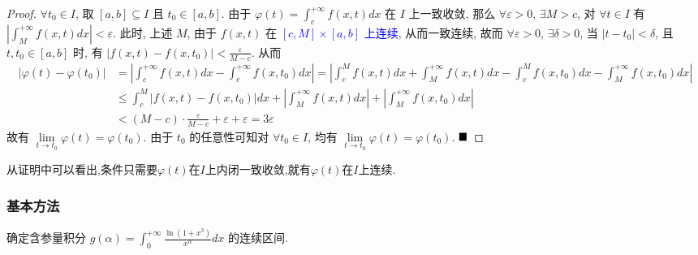 \documentclass[lang=cn,newtx,10pt,scheme=chinese]{elegantbook}
\begin{document}
\begin{proof}
$\forall t_0 \in I$, 取 $[a,b] \subseteq I$ 且 $t_0 \in [a,b]$. 由于 $\varphi(t) = \int_{c}^{+\infty} f(x,t) dx$ 在 $I$ 上一致收敛, 那么 $\forall \varepsilon > 0$, $\exists M > c$, 对 $\forall t \in I$ 有 $|\int_{M}^{+\infty} f(x,t) dx| < \varepsilon$.
此时, 上述 $M$, 由于 $f(x,t)$ 在 \textcolor{blue}{$[c,M] \times [a,b]$ 上连续}, 从而一致连续, 故而 $\forall \varepsilon > 0$, $\exists \delta > 0$, 当 $|t-t_0| < \delta$, 且 $t, t_0 \in [a,b]$ 时, 有 $|f(x,t) - f(x,t_0)| < \frac{\varepsilon}{M-c}$.
从而
\begin{align*} |\varphi(t) - \varphi(t_0)| &= \left|\int_{c}^{+\infty} f(x,t) dx - \int_{c}^{+\infty} f(x,t_0) dx\right| = \left|\int_{c}^{M} f(x,t) dx + \int_{M}^{+\infty} f(x,t) dx - \int_{c}^{M} f(x,t_0) dx - \int_{M}^{+\infty} f(x,t_0) dx\right| \\ &\le \int_{c}^{M} |f(x,t) - f(x,t_0)| dx + \left|\int_{M}^{+\infty} f(x,t) dx\right| + \left|\int_{M}^{+\infty} f(x,t_0) dx\right| \\ &< (M-c) \cdot \frac{\varepsilon}{M-c} + \varepsilon + \varepsilon = 3\varepsilon \end{align*}
故有 $\lim\limits_{t \to t_0} \varphi(t) = \varphi(t_0)$. 由于 $t_0$ 的任意性可知对 $\forall t_0 \in I$, 均有 $\lim\limits_{t \to t_0} \varphi(t) = \varphi(t_0)$. $\hfill \blacksquare$
\end{proof}

\begin{remark}
    从证明中可以看出,条件只需要$\varphi(t)$在$I$上内闭一致收敛,就有$\varphi(t)$在$I$上连续.
\end{remark}
\subsubsection*{基本方法}

\begin{example}[$\bigstar \bigstar$]
确定含参量积分 $g(\alpha) = \int_{0}^{+\infty} \frac{\ln(1+x^3)}{x^\alpha} dx$ 的连续区间.
\end{example}
\end{document}
